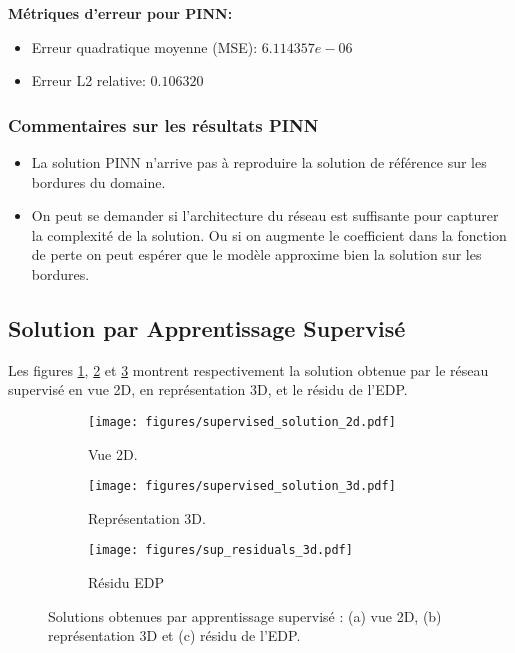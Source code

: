 \documentclass[11pt,a4paper]{article}
\begin{document}
\textbf{Métriques d'erreur pour PINN:}
\begin{itemize}
    \item Erreur quadratique moyenne (MSE): $6.114357e-06$
    \item Erreur L2 relative: $0.106320$
\end{itemize}

\subsubsection*{Commentaires sur les résultats PINN}
\begin{itemize}
    \item La solution PINN n'arrive pas à reproduire la solution de référence sur les bordures du domaine.
    \item On peut se demander si l'architecture du réseau est suffisante pour capturer la complexité de la solution. Ou si on augmente le coefficient dans la fonction de perte on peut espérer que le modèle approxime bien la solution sur les bordures.
\end{itemize}

\subsection{Solution par Apprentissage Supervisé}

Les figures \ref{fig:sup_solution_2d}, \ref{fig:sup_solution_3d} et \ref{fig:sup_resid_3d} montrent respectivement la solution obtenue par le réseau supervisé en vue 2D, en représentation 3D, et le résidu de l'EDP.

\begin{figure}[H]
    \centering
    \begin{subfigure}{0.45\textwidth}
        \centering
        \texttt{[image: figures/supervised\_solution\_2d.pdf]}
        \caption{Vue 2D.}
        \label{fig:sup_solution_2d}
    \end{subfigure}
    \hfill
    \begin{subfigure}{0.45\textwidth}
        \centering
        \texttt{[image: figures/supervised\_solution\_3d.pdf]}
        \caption{Représentation 3D.}
        \label{fig:sup_solution_3d}
    \end{subfigure}
    \begin{subfigure}{0.45\textwidth}
        \centering
        \texttt{[image: figures/sup\_residuals\_3d.pdf]}
        \caption{Résidu EDP}
        \label{fig:sup_resid_3d} 
    \end{subfigure}
    \caption{Solutions obtenues par apprentissage supervisé : (a) vue 2D, (b) représentation 3D et (c) résidu de l'EDP.}
    \label{fig:sup_solutions}
\end{figure}
\end{document}
